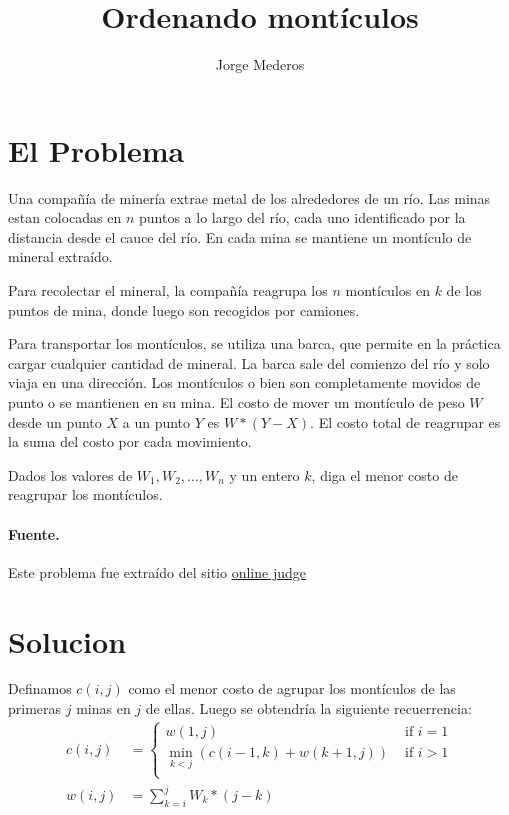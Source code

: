 \documentclass[spanish]{llncs}
\begin{document}
\title{Ordenando montículos}

\author{Jorge Mederos}


\maketitle

\section{El Problema}

Una compañía de minería extrae metal de los alrededores de un río.
Las minas estan colocadas en $n$ puntos a lo largo del río, cada uno
identificado por la distancia desde el cauce del río. En cada mina se
mantiene un montículo de mineral extraído.

Para recolectar el mineral, la compañía reagrupa los $n$ montículos en $k$
de los puntos de mina, donde luego son recogidos por camiones.

Para transportar los montículos, se utiliza una barca, que permite en la
práctica cargar cualquier cantidad de mineral. La barca sale del comienzo del
río y solo viaja en una dirección. Los montículos o bien son completamente movidos
de punto o se mantienen en su mina. El costo de mover un montículo de peso $W$ desde
un punto $X$ a un punto $Y$ es $W*(Y-X)$. El costo total de reagrupar es la suma del
costo por cada movimiento.

Dados los valores de $W_1, W_2, \dots, W_n$ y un entero $k$, diga el menor costo
de reagrupar los montículos.

\paragraph*{Fuente.} Este problema fue extraído del sitio 
\href{https://onlinejudge.org/index.php?option=com_onlinejudge&Itemid=8&page=show_problem&problem=3969}{online judge}

\section{Solucion}

Definamos $c(i,j)$ como el menor costo de agrupar los montículos de las primeras $j$ minas
en $j$ de ellas. Luego se obtendría la siguiente recuerrencia:
\begin{align}
	\label{eq:rec:c}
	c(i,j)                          & =                          
	\begin{cases}
	w(1,j)                          & \text{ if $i = 1$}         \\
	\min_{k<j}(c(i-1,k) + w(k+1,j)) & \text{ if $i > 1$}         \\
	\end{cases}
	\\
	\label{eq:rec:w}
	w(i,j)                          & = \sum_{k=i}^{j} W_k*(j-k) 
\end{align}
\end{document}
